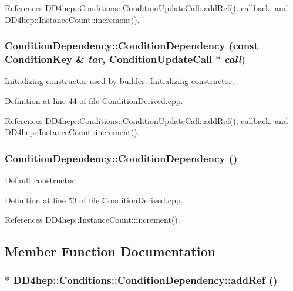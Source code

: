 References DD4hep::Conditions::ConditionUpdateCall::addRef(), callback, and DD4hep::InstanceCount::increment().\hypertarget{class_d_d4hep_1_1_conditions_1_1_condition_dependency_aa3f6e8cb34ed2a24a07d6648668bf594}{
\subsubsection[{ConditionDependency}]{\setlength{\rightskip}{0pt plus 5cm}ConditionDependency::ConditionDependency (const {\bf ConditionKey} \& {\em tar}, \/  {\bf ConditionUpdateCall} $\ast$ {\em call})}}
\label{class_d_d4hep_1_1_conditions_1_1_condition_dependency_aa3f6e8cb34ed2a24a07d6648668bf594}


Initializing constructor used by builder. Initializing constructor. 

Definition at line 44 of file ConditionDerived.cpp.

References DD4hep::Conditions::ConditionUpdateCall::addRef(), callback, and DD4hep::InstanceCount::increment().\hypertarget{class_d_d4hep_1_1_conditions_1_1_condition_dependency_a9468a2ef21f829e7acf1569392ba2711}{
\subsubsection[{ConditionDependency}]{\setlength{\rightskip}{0pt plus 5cm}ConditionDependency::ConditionDependency ()}}
\label{class_d_d4hep_1_1_conditions_1_1_condition_dependency_a9468a2ef21f829e7acf1569392ba2711}


Default constructor. 

Definition at line 53 of file ConditionDerived.cpp.

References DD4hep::InstanceCount::increment().

\subsection{Member Function Documentation}
\hypertarget{class_d_d4hep_1_1_conditions_1_1_condition_dependency_a84b132a3ba867a4588d34e75e8fc297a}{
\subsubsection[{addRef}]{$\ast$ DD4hep::Conditions::ConditionDependency::addRef ()}}
\label{class_d_d4hep_1_1_conditions_1_1_condition_dependency_a84b132a3ba867a4588d34e75e8fc297a}


